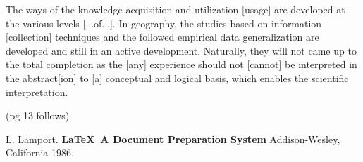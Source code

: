 \documentclass[12pt,leqno]{book}
\begin{document}
The ways of the knowledge acquisition and utilization [usage] are developed at the various levels [...of...]. In geography, the studies based on information [collection] techniques and the followed empirical data generalization are developed and still in an active development. Naturally, they will not came up to the total completion as the [any] experience should not [cannot] be interpreted in the abstract[ion] to [a] conceptual and logical basis, which enables the scientific interpretation.

(pg 13 follows)

\pagestyle{headings}




\begin{thebibliography}{99}
 L. Lamport. {\bf \LaTeX \ A Document Preparation System}
Addison-Wesley, California 1986.
\end{thebibliography}
\listoffigures
\listoftables

\end{document}
